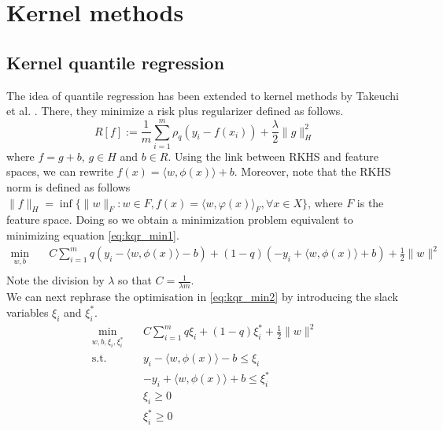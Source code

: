 \section{Kernel methods}
\subsection{Kernel quantile regression}
The idea of quantile regression has been extended to kernel methods by Takeuchi et al. \cite{takeuchi2006nonparametric}.
There, they minimize a risk plus regularizer defined as follows.
\begin{equation}\label{eq:kqr_min1}
    R[f]:=\frac{1}{m}\sum\limits_{i=1}^{m}\rho_q(y_i-f(x_i))+\frac{\lambda}{2}\|g\|_H^2
\end{equation}
where $f=g+b$, $g \in H$ and $b \in R$.
Using the link between RKHS and feature spaces, we can rewrite $f(x)=\langle w, \phi(x) \rangle+b$. Moreover, note that the RKHS norm is defined as follows $\|f\|_{H}=\inf\{\|w\|_{F}:w\in F,f(x)=\langle w,\varphi (x)\rangle _{F},\forall x\in X\}$, where $F$ is the feature space.
 Doing so we obtain a minimization problem equivalent to minimizing equation \ref{eq:kqr_min1}.
\begin{equation}\label{eq:kqr_min2}
    \begin{aligned}
    \min_{w,b} \quad & C \sum \limits_{i=1}^{m}
    q(y_i-\langle w, \phi(x) \rangle-b)+ (1-q)(-y_i+\langle w, \phi(x) \rangle+b)+ \frac{1}{2}\|w\|^2\\
    \end{aligned}
    \end{equation}
Note the division by $\lambda$ so that $C=\frac{1}{\lambda m}$.
\\
We can next rephrase the optimisation in \ref{eq:kqr_min2} by introducing the slack variables $\xi_i$ and $\xi_i^*$.
\begin{equation}\label{eq:kqr_min3}
    \begin{aligned}
        \min_{w,b,\xi_i,\xi_i^*} \quad & C \sum \limits_{i=1}^{m}
        q \xi_i+ (1-q)\xi_i^*+ \frac{1}{2}\|w\|^2\\
    \textrm{s.t.} \quad & y_i-\langle w, \phi(x) \rangle-b \leq \xi_i\\
    & -y_i+\langle w, \phi(x) \rangle+b \leq \xi_i^*\\
      &\xi_i\geq0    \\
      &\xi_i^*\geq0    \\
    \end{aligned}
    \end{equation}
